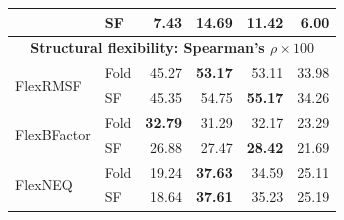 \documentclass{article}
\begin{document}
\begin{table}[!htbp]
\begin{tabular}{@{}llrrrr@{}}
 & SF & 7.43 & \textbf{14.69} & 11.42 & 6.00 \\
\midrule
\multicolumn{6}{c}{\textbf{Structural flexibility: Spearman's $\rho\times100$}} \\
\midrule
\multirow{2}{*}{FlexRMSF} & Fold & 45.27 & \textbf{53.17} & 53.11 & 33.98 \\
 & SF & 45.35 & 54.75 & \textbf{55.17} & 34.26 \\
\multirow{2}{*}{FlexBFactor} & Fold & \textbf{32.79} & 31.29 & 32.17 & 23.29 \\
 & SF & 26.88 & 27.47 & \textbf{28.42} & 21.69 \\
\multirow{2}{*}{FlexNEQ} & Fold & 19.24 & \textbf{37.63} & 34.59 & 25.11 \\
 & SF & 18.64 & \textbf{37.61} & 35.23 & 25.19 \\
\bottomrule
\end{tabular}
\end{table}
\end{document}
